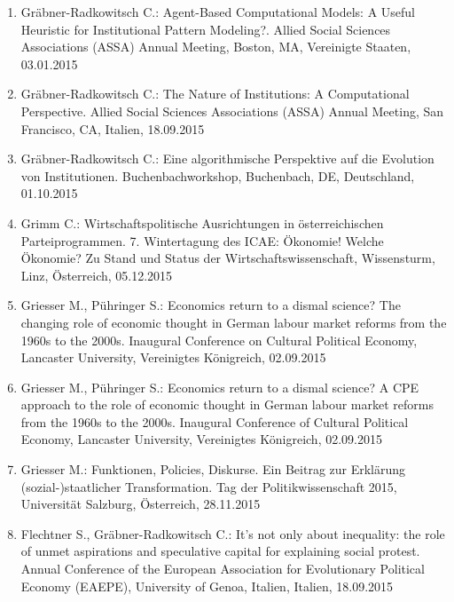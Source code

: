 \begin{enumerate}
	\item Gräbner-Radkowitsch C.: Agent-Based Computational Models: A Useful Heuristic for Institutional Pattern Modeling?. Allied Social Sciences Associations (ASSA) Annual Meeting, Boston, MA, Vereinigte Staaten, 03.01.2015
	\item Gräbner-Radkowitsch C.: The Nature of Institutions: A Computational Perspective. Allied Social Sciences Associations (ASSA) Annual Meeting, San Francisco, CA, Italien, 18.09.2015
	\item Gräbner-Radkowitsch C.: Eine algorithmische Perspektive auf die Evolution von Institutionen. Buchenbachworkshop, Buchenbach, DE, Deutschland, 01.10.2015
	\item Grimm C.: Wirtschaftspolitische Ausrichtungen in österreichischen Parteiprogrammen. 7. Wintertagung des ICAE: Ökonomie! Welche Ökonomie? Zu Stand und Status der Wirtschaftswissenschaft, Wissensturm, Linz, Österreich, 05.12.2015
	\item Griesser M., Pühringer S.: Economics return to a dismal science? The changing role of economic thought in German labour market reforms from the 1960s to the 2000s. Inaugural Conference on Cultural Political Economy, Lancaster University, Vereinigtes Königreich, 02.09.2015
	\item Griesser M., Pühringer S.: Economics return to a dismal science? A CPE approach to the role of economic thought in German labour market reforms from the 1960s to the 2000s. Inaugural Conference of Cultural Political Economy, Lancaster University, Vereinigtes Königreich, 02.09.2015
	\item Griesser M.: Funktionen, Policies, Diskurse. Ein Beitrag zur Erklärung (sozial-)staatlicher Transformation. Tag der Politikwissenschaft 2015, Universität Salzburg, Österreich, 28.11.2015
	\item Flechtner S., Gräbner-Radkowitsch C.: It’s not only about inequality: the role of unmet aspirations and speculative capital for explaining social protest. Annual Conference of the European Association for Evolutionary Political Economy (EAEPE), University of Genoa, Italien, Italien, 18.09.2015
\end{enumerate}

